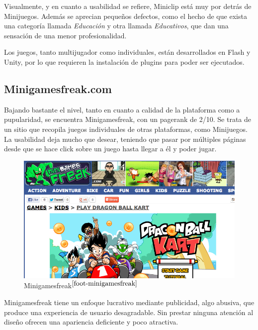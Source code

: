 Visualmente, y en cuanto a usabilidad se refiere, Miniclip está muy por detrás de Minijuegos. Además se aprecian pequeños defectos, como el hecho de que exista una categoría llamada {\it Educación} y otra llamada {\it Educativos}, que dan una sensación de una menor profesionalidad.

Los juegos, tanto multijugador como individuales, están desarrollados en Flash y Unity, por lo que requieren la instalación de plugins para poder ser ejecutados.

\subsection*{Minigamesfreak.com}

Bajando bastante el nivel, tanto en cuanto a calidad de la plataforma como a pupularidad, se encuentra Minigamesfreak, con un pagerank de 2/10. Se trata de un sitio que recopila juegos individuales de otras plataformas, como Minijuegos. La usabilidad deja mucho que desear, teniendo que pasar por múltiples páginas desde que se hace click sobre un juego hasta llegar a él y poder jugar.

\begin{figure}[h]
  \begin{center}
    \includegraphics[width=\textwidth]{images/minigamesfreak.png}
    \caption[Minigamesfreak]{Minigamesfreak$^{\ref{foot-minigamesfreak}}$}
    \label{fig::minigamesfreak}
  \end{center}
\end{figure}
\addtocounter{footnote}{1}\footnotetext{\label{foot-minigamesfreak}{\tt http://www.minigamesfreak.com}}
Minigamesfreak tiene un enfoque lucrativo mediante publicidad, algo abusiva, que produce una experiencia de usuario desagradable. Sin prestar ninguna atención al diseño ofrecen una apariencia deficiente y poco atractiva.


